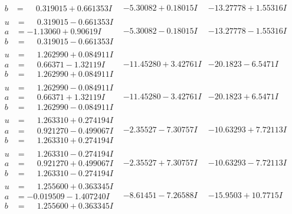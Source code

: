 \documentclass[1p]{elsarticle_modified}
\theoremstyle{definition}
\begin{document}
$$\begin{array}{c|c|c}
\begin{aligned}
b &= \phantom{-}0.319015 + 0.661353 I\end{aligned}
 & -5.30082 + 0.18015 I & -13.27778 + 1.55316 I \\ \hline\begin{aligned}
u &= \phantom{-}0.319015 - 0.661353 I \\
a &= -1.13060 + 0.90619 I \\
b &= \phantom{-}0.319015 - 0.661353 I\end{aligned}
 & -5.30082 - 0.18015 I & -13.27778 - 1.55316 I \\ \hline\begin{aligned}
u &= \phantom{-}1.262990 + 0.084911 I \\
a &= \phantom{-}0.66371 - 1.32119 I \\
b &= \phantom{-}1.262990 + 0.084911 I\end{aligned}
 & -11.45280 + 3.42761 I & -20.1823 - 6.5471 I \\ \hline\begin{aligned}
u &= \phantom{-}1.262990 - 0.084911 I \\
a &= \phantom{-}0.66371 + 1.32119 I \\
b &= \phantom{-}1.262990 - 0.084911 I\end{aligned}
 & -11.45280 - 3.42761 I & -20.1823 + 6.5471 I \\ \hline\begin{aligned}
u &= \phantom{-}1.263310 + 0.274194 I \\
a &= \phantom{-}0.921270 - 0.499067 I \\
b &= \phantom{-}1.263310 + 0.274194 I\end{aligned}
 & -2.35527 - 7.30757 I & -10.63293 + 7.72113 I \\ \hline\begin{aligned}
u &= \phantom{-}1.263310 - 0.274194 I \\
a &= \phantom{-}0.921270 + 0.499067 I \\
b &= \phantom{-}1.263310 - 0.274194 I\end{aligned}
 & -2.35527 + 7.30757 I & -10.63293 - 7.72113 I \\ \hline\begin{aligned}
u &= \phantom{-}1.255600 + 0.363345 I \\
a &= -0.019509 - 1.407240 I \\
b &= \phantom{-}1.255600 + 0.363345 I\end{aligned}
 & -8.61451 - 7.26588 I & -15.9503 + 10.7715 I \\ \hline\begin{aligned}

\end{aligned}
\end{array}$$
\end{document}
